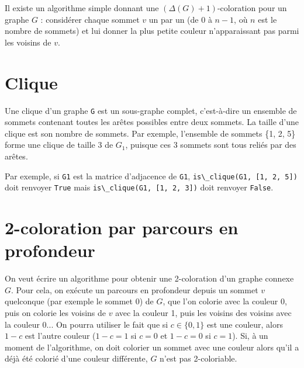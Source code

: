 
Il existe un algorithme simple donnant une $(\Delta(G) + 1)$-coloration pour un graphe $G$ : considérer chaque sommet $v$ un par un
(de 0 à $n - 1$, où $n$ est le nombre de sommets) et lui donner la plus petite couleur n’apparaissant pas parmi les voisins de $v$.


\section*{Clique}
Une clique d’un graphe \lstinline{G} est un sous-graphe complet, c’est-à-dire un ensemble de sommets contenant toutes les arêtes possibles
entre deux sommets. La taille d’une clique est son nombre de sommets.
Par exemple, l’ensemble de sommets \{1, 2, 5\} forme une clique de taille 3 de $G_1$, puisque ces 3 sommets sont tous reliés par des
arêtes.



Par exemple, si \lstinline{G1} est la matrice d’adjacence de \lstinline{G1}, \lstinline{is\_clique(G1, [1, 2, 5])} doit renvoyer \lstinline{True} mais \lstinline{is\_clique(G1, [1, 2, 3])} doit renvoyer \lstinline{False}.

\section*{2-coloration par parcours en profondeur}
On veut écrire un algorithme pour obtenir une 2-coloration d’un graphe connexe $G$. Pour cela, on exécute un parcours en
profondeur depuis un sommet $v$ quelconque (par exemple le sommet 0) de $G$, que l’on colorie avec la couleur 0, puis on colorie
les voisins de $v$ avec la couleur 1, puis les voisins des voisins avec la couleur 0...
On pourra utiliser le fait que si $c\in\{0, 1\}$ est une couleur, alors $1- c$ est l’autre couleur ($1 -c = 1$ si $c = 0$ et $1 - c = 0$ si $c = 1$).
Si, à un moment de l’algorithme, on doit colorier un sommet avec une couleur alors qu’il a déjà été colorié d’une couleur différente,
$G$ n’est pas 2-coloriable.

